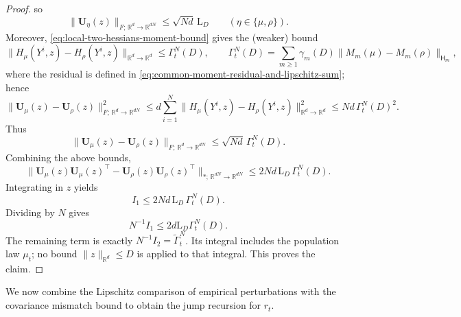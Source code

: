 \begin{proof}
so
\[
\|\mathbf U_\eta(z)\|_{F;\,\mathbb R^d\to\mathbb R^{dN}} \le \sqrt{Nd}\,\mathrm L_D
\qquad
(\eta\in\{\mu,\rho\}).
\]
Moreover, \cref{eq:local-two-hessians-moment-bound} gives the (weaker) bound
\[
\|H_\mu(Y^i,z)-H_\rho(Y^i,z)\|_{\mathbb R^d\to\mathbb R^d}
\le
\Gamma_t^N(D),
\qquad
\Gamma_t^N(D)=
\sum_{m\ge1}\gamma_m(D)\|M_m(\mu)-M_m(\rho)\|_{\mathsf H_m},
\]
where the residual is defined in \eqref{eq:common-moment-residual-and-lipschitz-sum}; hence
\[
\|\mathbf U_\mu(z)-\mathbf U_\rho(z)\|_{F;\,\mathbb R^d\to\mathbb R^{dN}}^2
\le
d\sum_{i=1}^N
\|H_\mu(Y^i,z)-H_\rho(Y^i,z)\|_{\mathbb R^d\to\mathbb R^d}^2
\le
Nd\,\Gamma_t^N(D)^2.
\]
Thus
\[
\|\mathbf U_\mu(z)-\mathbf U_\rho(z)\|_{F;\,\mathbb R^d\to\mathbb R^{dN}} \le \sqrt{Nd}\,\Gamma_t^N(D).
\]
Combining the above bounds,
\[
\bigl\|
\mathbf U_\mu(z)\mathbf U_\mu(z)^\top
-
\mathbf U_\rho(z)\mathbf U_\rho(z)^\top
\bigr\|_{*;\,\mathbb R^{dN}\to\mathbb R^{dN}}
\le
2Nd\,\mathrm L_D\,\Gamma_t^N(D).
\]
Integrating in \(z\) yields
\[
I_1 \le 2Nd\,\mathrm L_D\,\Gamma_t^N(D).
\]
Dividing by $N$ gives
\[
 N^{-1}I_1\le2d\mathrm L_D\Gamma_t^N(D).
\]
The remaining term is exactly $N^{-1}I_2=\widetilde\Gamma_t^N$.
Its integral includes the population law $\mu_t$; no bound $\|z\|_{\mathbb R^d}\le D$
is applied to that integral. This proves the claim.
\end{proof}

We now combine the Lipschitz comparison of empirical perturbations with the
covariance mismatch bound to obtain the jump recursion for \(r_t\).

